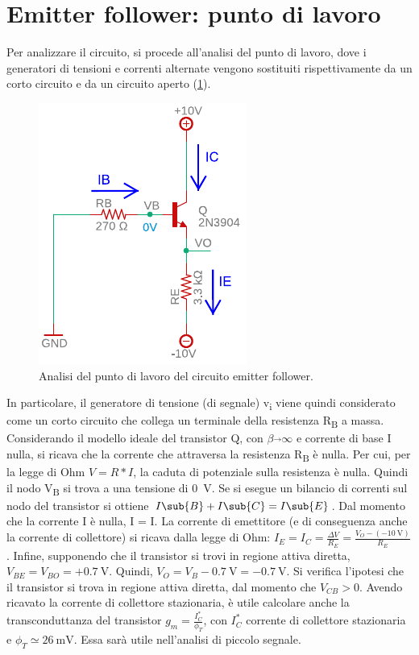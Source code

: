 \section{Emitter follower: punto di lavoro}
Per analizzare il circuito, si procede all'analisi del punto di lavoro, dove i generatori di tensioni e correnti alternate vengono sostituiti rispettivamente da un corto circuito e da un circuito aperto (\Fig\ref{fig:emitterfollwer_puntodilavoro}).
\begin{figure}[h!]
	\centering
	\includegraphics[width=0.4\linewidth]{./OtherFiles/Laboratorio 1/emitter follower_punto di lavoro_printout}
	\caption{Analisi del punto di lavoro del circuito emitter follower.}
	\label{fig:emitterfollwer_puntodilavoro}
\end{figure}
In particolare, il generatore di tensione (di segnale) v\textsubscript{i} viene quindi considerato come un corto circuito che collega un terminale della resistenza R\textsubscript{B} a massa. Considerando il modello ideale del transistor Q, con $\beta\overrightarrow{}\infty$ e corrente di base I nulla, si ricava che la corrente che attraversa la resistenza R\textsubscript{B} è nulla. Per cui, per la legge di Ohm $V=R*I$, la caduta di potenziale sulla resistenza è nulla. Quindi il nodo V\textsubscript{B} si trova a una tensione di \SI{0}{\volt}. Se si esegue un bilancio di correnti sul nodo del transistor si ottiene $I\sub{B}+I\sub{C}=I\sub{E}$. Dal momento che la corrente I è nulla, I = I. La corrente di emettitore (e di conseguenza anche la corrente di collettore) si ricava dalla legge di Ohm: $I_E=I_C=\frac{\Delta V}{R_E}=\frac{V_O-(-\SI{10}{\volt})}{R_E}$. Infine, supponendo che il transistor si trovi in regione attiva diretta, $V_{BE}=V_{BO}=+\SI{0.7}{\volt}$. Quindi, $V_O=V_B-\SI{0.7}{\volt}= -\SI{0.7}{\volt}$. Si verifica l'ipotesi che il transistor si trova in regione attiva diretta, dal momento che $V_{CB}>0$. Avendo ricavato la corrente di collettore stazionaria, è utile calcolare anche la transconduttanza del transistor $g_m=\frac{I_C^*}{\phi_T}$, con $I_C^*$ corrente di collettore stazionaria e $\phi_T\simeq\SI{26}{\milli\volt}$. Essa sarà utile nell'analisi di piccolo segnale.

